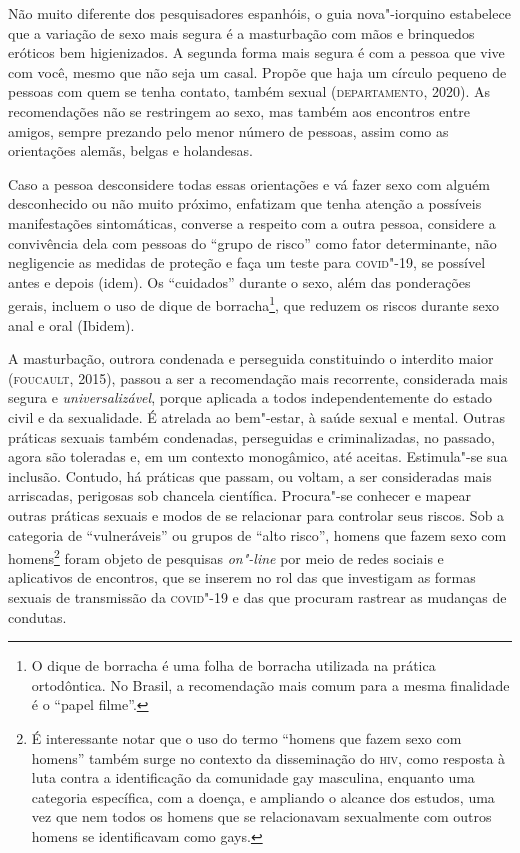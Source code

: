 Não muito diferente dos pesquisadores espanhóis, o guia nova"-iorquino
estabelece que a variação de sexo mais segura é a masturbação com mãos e
brinquedos eróticos bem higienizados. A segunda forma mais segura é com
a pessoa que vive com você, mesmo que não seja um casal. Propõe que haja
um círculo pequeno de pessoas com quem se tenha contato, também sexual
(\textsc{departamento}, 2020). As recomendações não se restringem ao sexo, mas
também aos encontros entre amigos, sempre prezando pelo menor número de
pessoas, assim como as orientações alemãs, belgas e holandesas.

Caso a pessoa desconsidere todas essas orientações e vá fazer sexo com
alguém desconhecido ou não muito próximo, enfatizam que tenha atenção a
possíveis manifestações sintomáticas, converse a respeito com a outra
pessoa, considere a convivência dela com pessoas do ``grupo de risco''
como fator determinante, não negligencie as medidas de proteção e faça
um teste para \textsc{covid}"-19, se possível antes e depois (idem). Os
``cuidados'' durante o sexo, além das ponderações gerais, incluem o uso
de dique de borracha\footnote{O dique de borracha é uma folha de
  borracha utilizada na prática ortodôntica. No Brasil, a recomendação
  mais comum para a mesma finalidade é o ``papel filme''.}, que reduzem
os riscos durante sexo anal e oral (Ibidem).

A masturbação, outrora condenada e perseguida constituindo o interdito
maior (\textsc{foucault}, 2015), passou a ser a recomendação mais recorrente,
considerada mais segura e \emph{universalizável}, porque aplicada a
todos independentemente do estado civil e da sexualidade. É atrelada ao
bem"-estar, à saúde sexual e mental. Outras práticas sexuais também
condenadas, perseguidas e criminalizadas, no passado, agora são
toleradas e, em um contexto monogâmico, até aceitas. Estimula"-se sua
inclusão. Contudo, há práticas que passam, ou voltam, a ser consideradas
mais arriscadas, perigosas sob chancela científica. Procura"-se conhecer
e mapear outras práticas sexuais e modos de se relacionar para controlar
seus riscos. Sob a categoria de ``vulneráveis'' ou grupos de ``alto
risco'', homens que fazem sexo com homens\footnote{É interessante notar
  que o uso do termo ``homens que fazem sexo com homens'' também surge
  no contexto da disseminação do \textsc{hiv}, como resposta à luta contra a
  identificação da comunidade gay masculina, enquanto uma categoria
  específica, com a doença, e ampliando o alcance dos estudos, uma vez
  que nem todos os homens que se relacionavam sexualmente com outros
  homens se identificavam como gays.} foram objeto de pesquisas
\emph{on"-line} por meio de redes sociais e aplicativos de encontros, que
se inserem no rol das que investigam as formas sexuais de transmissão da
\textsc{covid}"-19 e das que procuram rastrear as mudanças de condutas.

